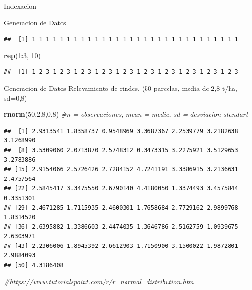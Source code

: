 \documentclass[
  ignorenonframetext,
]{beamer}
\newenvironment{Shaded}{\begin{snugshade}}{\end{snugshade}}
\newcommand{\CommentTok}[1]{\textcolor[rgb]{0.56,0.35,0.01}{\textit{#1}}}
\newcommand{\DecValTok}[1]{\textcolor[rgb]{0.00,0.00,0.81}{#1}}
\newcommand{\FloatTok}[1]{\textcolor[rgb]{0.00,0.00,0.81}{#1}}
\newcommand{\FunctionTok}[1]{\textcolor[rgb]{0.13,0.29,0.53}{\textbf{#1}}}
\newcommand{\NormalTok}[1]{#1}
\newcommand{\SpecialCharTok}[1]{\textcolor[rgb]{0.81,0.36,0.00}{\textbf{#1}}}
\begin{document}
\begin{frame}[fragile]{Indexacion}
\begin{block}{Generacion de Datos}
\begin{verbatim}
##  [1] 1 1 1 1 1 1 1 1 1 1 1 1 1 1 1 1 1 1 1 1 1 1 1 1 1 1 1 1 1 1
\end{verbatim}

\begin{Shaded}
\begin{Highlighting}[]
\FunctionTok{rep}\NormalTok{(}\DecValTok{1}\SpecialCharTok{:}\DecValTok{3}\NormalTok{, }\DecValTok{10}\NormalTok{)}
\end{Highlighting}
\end{Shaded}

\begin{verbatim}
##  [1] 1 2 3 1 2 3 1 2 3 1 2 3 1 2 3 1 2 3 1 2 3 1 2 3 1 2 3 1 2 3
\end{verbatim}
\end{block}

\begin{block}{Generacion de Datos}
\protect\hypertarget{generacion-de-datos-1}{}
Relevamiento de rindes, (50 parcelas, media de 2,8 t/ha, sd=0,8)

\begin{Shaded}
\begin{Highlighting}[]
\FunctionTok{rnorm}\NormalTok{(}\DecValTok{50}\NormalTok{,}\FloatTok{2.8}\NormalTok{,}\FloatTok{0.8}\NormalTok{) }\CommentTok{\#n = observaciones, mean = media, sd = desviacion standart}
\end{Highlighting}
\end{Shaded}

\begin{verbatim}
##  [1] 2.9313541 1.8358737 0.9548969 3.3687367 2.2539779 3.2182638 3.1268990
##  [8] 3.5309060 2.0713870 2.5748312 0.3473315 3.2275921 3.5129653 3.2783886
## [15] 2.9154066 2.5726426 2.7284152 4.7241191 3.3386915 3.2136631 2.4757564
## [22] 2.5845417 3.3475550 2.6790140 4.4180050 1.3374493 3.4575844 0.3351301
## [29] 2.4671285 1.7115935 2.4600301 1.7658684 2.7729162 2.9899768 1.8314520
## [36] 2.6395882 1.3386603 2.4474035 1.3646786 2.5162759 1.0939675 2.6303971
## [43] 2.2306006 1.8945392 2.6612903 1.7150900 3.1500022 1.9872801 2.9884093
## [50] 4.3186408
\end{verbatim}

\begin{Shaded}
\begin{Highlighting}[]
\CommentTok{\#https://www.tutorialspoint.com/r/r\_normal\_distribution.htm}
\end{Highlighting}
\end{Shaded}
\end{block}


\end{frame}
\end{document}
